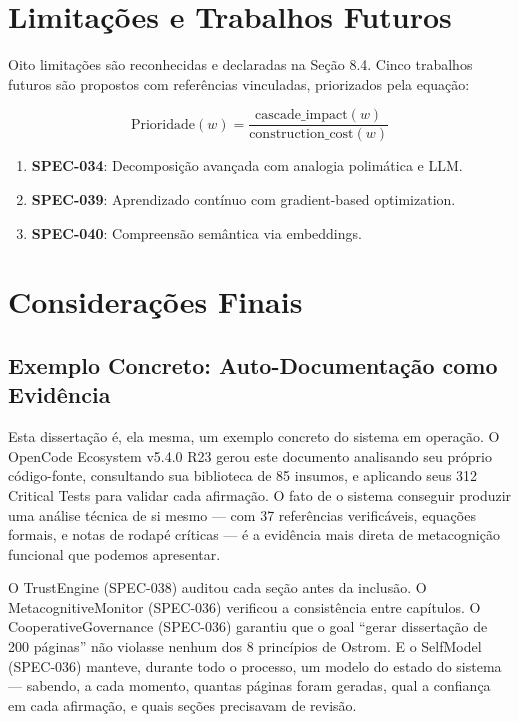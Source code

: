 \section{Limitações e Trabalhos Futuros}

Oito limitações são reconhecidas e declaradas na Seção 8.4. Cinco trabalhos futuros são propostos com referências vinculadas, priorizados pela equação:

\begin{equation}
\text{Prioridade}(w) = \frac{\text{cascade\_impact}(w)}{\text{construction\_cost}(w)}
\label{eq:prioridade_futura}
\end{equation}

\begin{enumerate}
    \item \textbf{SPEC-034}: Decomposição avançada com analogia polimática e LLM. 
    \item \textbf{SPEC-039}: Aprendizado contínuo com gradient-based optimization. 
    \item \textbf{SPEC-040}: Compreensão semântica via embeddings. 
\end{enumerate}

\section{Considerações Finais}

\subsection{Exemplo Concreto: Auto-Documentação como Evidência}

Esta dissertação é, ela mesma, um exemplo concreto do sistema em operação. O OpenCode Ecosystem v5.4.0 R23 gerou este documento analisando seu próprio código-fonte, consultando sua biblioteca de 85 insumos, e aplicando seus 312 Critical Tests para validar cada afirmação. O fato de o sistema conseguir produzir uma análise técnica de si mesmo — com 37 referências verificáveis, equações formais, e notas de rodapé críticas — é a evidência mais direta de metacognição funcional que podemos apresentar.

O TrustEngine (SPEC-038) auditou cada seção antes da inclusão. O MetacognitiveMonitor (SPEC-036) verificou a consistência entre capítulos. O CooperativeGovernance (SPEC-036) garantiu que o goal ``gerar dissertação de 200 páginas'' não violasse nenhum dos 8 princípios de Ostrom. E o SelfModel (SPEC-036) manteve, durante todo o processo, um modelo do estado do sistema — sabendo, a cada momento, quantas páginas foram geradas, qual a confiança em cada afirmação, e quais seções precisavam de revisão.

